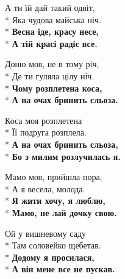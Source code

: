\medskip

\begin{minipage}{\linewidth}
А ти їй дай такий одвіт,\\*
Яка чудова майська ніч.\\*
\textbf{Весна іде, красу несе,}\\*
\textbf{А тій красі радіє все.}\\
\end{minipage}\par\medskip\nobreak

\medskip

\begin{minipage}{\linewidth}
Доню моя, не в тому річ,\\*
Де ти гуляла цілу ніч.\\*
\textbf{Чому розплетена коса,}\\*
\textbf{А на очах бринить сльоза.}\\
\end{minipage}\par\medskip\nobreak

\medskip

\begin{minipage}{\linewidth}
Коса моя розплетена\\*
Її подруга розплела.\\*
\textbf{А на очах бринить сльоза,}\\*
\textbf{Бо з милим розлучилась я.}\\
\end{minipage}\par\medskip\nobreak

\medskip

\begin{minipage}{\linewidth}
Мамо моя, прийшла пора,\\*
А я весела, молода.\\*
\textbf{Я жити хочу, я люблю,}\\*
\textbf{Мамо, не лай дочку свою.}\\
\end{minipage}\par\medskip\nobreak

\medskip

\begin{minipage}{\linewidth}
Ой у вишневому саду\\*
Там соловейко щебетав.\\*
\textbf{Додому я просилася,}\\*
\textbf{А він мене все не пускав.}\\
\end{minipage}

